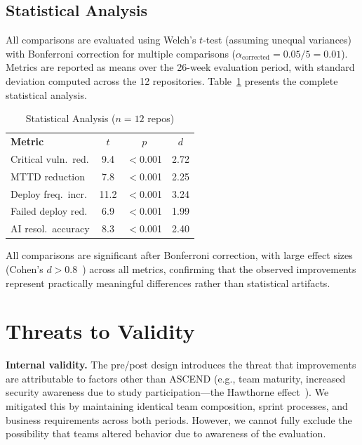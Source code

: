 \documentclass[journal]{IEEEtran}
\begin{document}
\subsection{Statistical Analysis}

All comparisons are evaluated using Welch's $t$-test (assuming unequal variances) with Bonferroni correction for multiple comparisons ($\alpha_{\text{corrected}} = 0.05/5 = 0.01$). Metrics are reported as means over the 26-week evaluation period, with standard deviation computed across the 12 repositories. Table~\ref{tab:stats} presents the complete statistical analysis.

\begin{table}[h]
\centering
\caption{Statistical Analysis ($n=12$ repos)}
\label{tab:stats}
\scriptsize
\begin{tabular}{@{}lccc@{}}
\rowcolor{TableHeader}\color{white}\textbf{Metric} & \color{white}\textbf{$t$} & \color{white}\textbf{$p$} & \color{white}\textbf{$d$} \\
\rowcolor{TableAlt}Critical vuln.\ red. & 9.4 & $<$0.001 & 2.72 \\
\rowcolor{white}MTTD reduction & 7.8 & $<$0.001 & 2.25 \\
\rowcolor{TableAlt}Deploy freq.\ incr. & 11.2 & $<$0.001 & 3.24 \\
\rowcolor{white}Failed deploy red. & 6.9 & $<$0.001 & 1.99 \\
\rowcolor{TableAlt}AI resol.\ accuracy & 8.3 & $<$0.001 & 2.40 \\
\end{tabular}
\end{table}

All comparisons are significant after Bonferroni correction, with large effect sizes (Cohen's $d > 0.8$~\cite{cohen1988}) across all metrics, confirming that the observed improvements represent practically meaningful differences rather than statistical artifacts.

\section{Threats to Validity}
\label{sec:threats}

\textbf{Internal validity.} The pre/post design introduces the threat that improvements are attributable to factors other than ASCEND (e.g., team maturity, increased security awareness due to study participation---the Hawthorne effect~\cite{mayo1949}). We mitigated this by maintaining identical team composition, sprint processes, and business requirements across both periods. However, we cannot fully exclude the possibility that teams altered behavior due to awareness of the evaluation.
\end{document}
